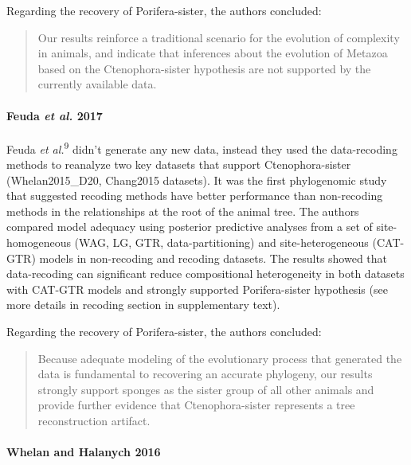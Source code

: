 \documentclass[]{article}
\let\oldparagraph\paragraph
\renewcommand{\paragraph}[1]{\oldparagraph{#1}\mbox{}}
\begin{document}
Regarding the recovery of Porifera-sister, the authors concluded:

\begin{quote}
Our results reinforce a traditional scenario for the evolution of
complexity in animals, and indicate that inferences about the evolution
of Metazoa based on the Ctenophora-sister hypothesis are not supported
by the currently available data.
\end{quote}

\hypertarget{feuda-et-al.-2017}{%
\paragraph{\texorpdfstring{Feuda \emph{et al.}
2017}{Feuda et al. 2017}}\label{feuda-et-al.-2017}}

Feuda \emph{et al.}\textsuperscript{9} didn't generate any new data,
instead they used the data-recoding methods to reanalyze two key
datasets that support Ctenophora-sister (Whelan2015\_D20, Chang2015
datasets). It was the first phylogenomic study that suggested recoding
methods have better performance than non-recoding methods in the
relationships at the root of the animal tree. The authors compared model
adequacy using posterior predictive analyses from a set of
site-homogeneous (WAG, LG, GTR, data-partitioning) and
site-heterogeneous (CAT-GTR) models in non-recoding and recoding
datasets. The results showed that data-recoding can significant reduce
compositional heterogeneity in both datasets with CAT-GTR models and
strongly supported Porifera-sister hypothesis (see more details in
recoding section in supplementary text).

Regarding the recovery of Porifera-sister, the authors concluded:

\begin{quote}
Because adequate modeling of the evolutionary process that generated the
data is fundamental to recovering an accurate phylogeny, our results
strongly support sponges as the sister group of all other animals and
provide further evidence that Ctenophora-sister represents a tree
reconstruction artifact.
\end{quote}

\hypertarget{whelan-and-halanych-2016}{%
\paragraph{Whelan and Halanych 2016}\label{whelan-and-halanych-2016}}
\end{document}

